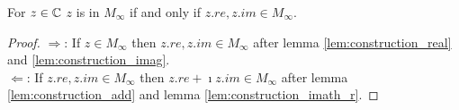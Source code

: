 \begin{corollary}
    \label{cor:z_iff_re_im_M_inf}
    \leanok
    For $z \in \mathbb{C}$ $z$ is in $M_{\infty}$ if and only if $z.re, z.im \in M_{\infty}$.
\end{corollary}
\begin{proof}
    $\Rightarrow$: If $z \in M_{\infty}$ then $z.re, z.im \in M_{\infty}$ after lemma \ref{lem:construction_real} and \ref{lem:construction_imag}.\\
    $\Leftarrow$: If $z.re, z.im \in M_{\infty}$ then $z.re + \imath z.im \in M_{\infty}$ after lemma \ref{lem:construction_add} and lemma \ref{lem:construction_imath_r}.
\end{proof}

